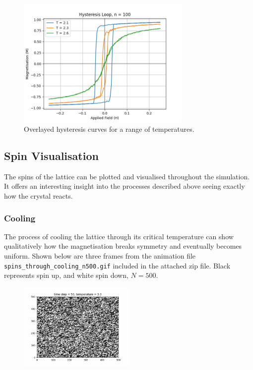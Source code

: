 \documentclass[a4paper, 12pt]{article}
\begin{document}
\begin{figure}[H]
\centering
\includegraphics[width=0.75\textwidth]{./resources/loops_overlayed.png}
\caption{Overlayed hysteresis curves for a range of temperatures.}
\end{figure}



\subsection{Spin Visualisation}
The spins of the lattice can be plotted and visualised throughout the simulation. It offers an interesting insight into the processes described above seeing exactly how the crystal reacts.

\newpage
\subsubsection{Cooling}
The process of cooling the lattice through its critical temperature can show qualitatively how the magnetisation breaks symmetry and eventually becomes uniform. Shown below are three frames from the animation file \verb!spins_through_cooling_n500.gif! included in the attached zip file. Black represents spin up, and white spin down, \(N=500\).


\begin{figure}[H]
	\centering
	\includegraphics[width=0.5\textwidth]{./resources/frames/cooling_spins_1.jpg}
\end{figure}
\end{document}
